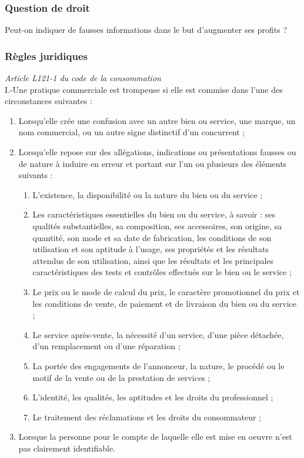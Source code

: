 \subsubsection{Question de droit}
Peut-on indiquer de fausses informations dans le but d'augmenter ses profits ?
\subsubsection{Règles juridiques}
\textit{Article L121-1 du code de la consommation}\\
I.-Une pratique commerciale est trompeuse si elle est commise dans l'une des circonstances suivantes :\\
\begin{enumerate}
\item Lorsqu'elle crée une confusion avec un autre bien ou service, une marque, un nom commercial, ou un autre signe distinctif d'un concurrent ;\\
\item Lorsqu'elle repose sur des allégations, indications ou présentations fausses ou de nature à induire en erreur et portant sur l'un ou plusieurs des éléments suivants :\\
\begin{enumerate}
\item L'existence, la disponibilité ou la nature du bien ou du service ;\\
\item Les caractéristiques essentielles du bien ou du service, à savoir : ses qualités substantielles, sa composition, ses accessoires, son origine, sa quantité, son mode et sa date de fabrication, les conditions de son utilisation et son aptitude à l'usage, ses propriétés et les résultats attendus de son utilisation, ainsi que les résultats et les principales caractéristiques des tests et contrôles effectués sur le bien ou le service ;\\
\item Le prix ou le mode de calcul du prix, le caractère promotionnel du prix et les conditions de vente, de paiement et de livraison du bien ou du service ;\\
\item Le service après-vente, la nécessité d'un service, d'une pièce détachée, d'un remplacement ou d'une réparation ;\\
\item La portée des engagements de l'annonceur, la nature, le procédé ou le motif de la vente ou de la prestation de services ;\\
\item L'identité, les qualités, les aptitudes et les droits du professionnel ;\\
\item Le traitement des réclamations et les droits du consommateur ;\\
\end{enumerate}
\item Lorsque la personne pour le compte de laquelle elle est mise en oeuvre n'est pas clairement identifiable. 
\end{enumerate}
